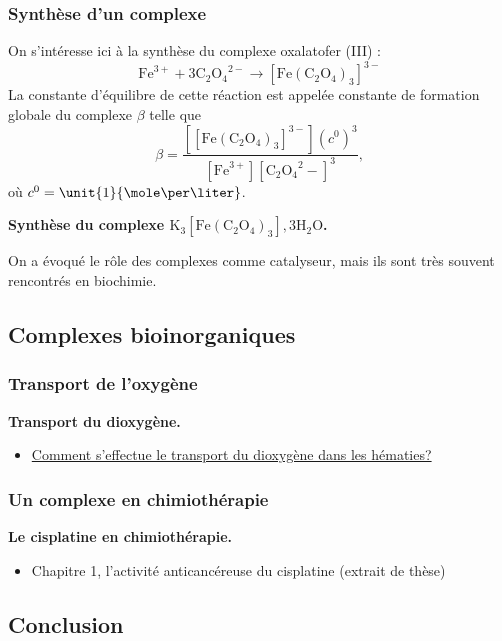 \subsubsection{Synthèse d'un complexe}

On s'intéresse ici à la synthèse du complexe oxalatofer (III) :
\begin{equation*}
\mathrm{Fe}^{3+} + 3 \mathrm{C_2O_4}^{2-} \rightarrow \mathrm{[Fe(C_2O_4)_3]}^{3-}
\end{equation*}
La constante d'équilibre de cette réaction est appelée constante de formation globale du complexe $\beta$ telle que
\begin{equation*}
\beta = \frac{[\mathrm{[Fe(C_2O_4)_3]}^{3-}](c^0)^3}{[\mathrm{Fe}^{3+}][\mathrm{C_2O_4}^2-]^3},
\end{equation*}
où $c^0 = \unit{1}{\mole\per\liter}$.

\begin{experience}
\textbf{Synthèse du complexe $\mathrm{K_3[Fe(C_2O_4)_3],3H_2O}$.}
\end{experience}

\begin{transition}
On a évoqué le rôle des complexes comme catalyseur, mais ils sont très souvent rencontrés en biochimie.
\end{transition}

\subsection{Complexes bioinorganiques}

\subsubsection{Transport de l'oxygène}

\begin{slide}
\textbf{Transport du dioxygène.}
\end{slide}

\begin{itemize}
\item \href{https://www.rts.ch/decouverte/sante-et-medecine/corps-humain/9852272-comment-s-effectue-le-transport-du-dioxygene-dans-les-hematies-.html}{Comment s'effectue le transport du dioxygène dans les hématies?}
\end{itemize}

\subsubsection{Un complexe en chimiothérapie}

\begin{slide}
\textbf{Le cisplatine en chimiothérapie.}
\end{slide}
\begin{itemize}
\item Chapitre 1, l'activité anticancéreuse du cisplatine (extrait de thèse)
\end{itemize}

\subsection*{Conclusion}

\newpage